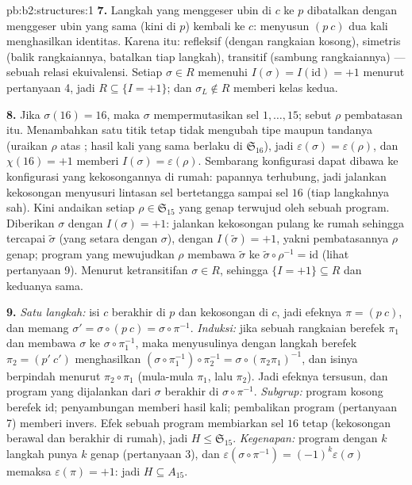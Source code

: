 \begin{solution}{pb:b2:structures:1}
\textbf{7.} Langkah yang menggeser ubin di $c$ ke $p$ dibatalkan
dengan menggeser ubin yang sama (kini di $p$) kembali ke $c$: menyusun
$(p\ c)$ dua kali menghasilkan identitas. Karena itu: refleksif (dengan
rangkaian kosong), simetris (balik rangkaiannya, batalkan tiap langkah),
transitif (sambung rangkaiannya) --- sebuah relasi ekuivalensi. Setiap
$\sigma \in R$ memenuhi $I(\sigma) = I(\mathrm{id}) = +1$ menurut
pertanyaan 4, jadi $R \subseteq \{I = +1\}$; dan $\sigma_L \notin R$
memberi kelas kedua.

\textbf{8.} Jika $\sigma(16) = 16$, maka $\sigma$ mempermutasikan
sel $1, \dots, 15$; sebut $\rho$ pembatasan itu. Menambahkan satu
titik tetap tidak mengubah tipe  maupun tandanya
(uraikan $\rho$ atas ; hasil kali yang sama berlaku di
$\mathfrak{S}_{16}$), jadi $\varepsilon(\sigma) =
\varepsilon(\rho)$, dan $\chi(16) = +1$ memberi $I(\sigma) =
\varepsilon(\rho)$. Sembarang konfigurasi dapat dibawa ke konfigurasi
yang kekosongannya di rumah: papannya terhubung, jadi jalankan
kekosongan menyusuri lintasan sel bertetangga sampai sel $16$ (tiap
langkahnya sah). Kini andaikan setiap $\rho \in \mathfrak{S}_{15}$ yang
genap terwujud oleh sebuah program. Diberikan $\sigma$ dengan $I(\sigma)
= +1$: jalankan kekosongan pulang ke rumah sehingga tercapai
$\widetilde\sigma$ (yang setara dengan $\sigma$), dengan
$I(\widetilde\sigma) = +1$, yakni pembatasannya $\rho$ genap; program
yang mewujudkan $\rho$ membawa $\widetilde\sigma$ ke
$\widetilde\sigma \circ \rho^{-1} = \mathrm{id}$ (lihat pertanyaan
9). Menurut ketransitifan $\sigma \in R$, sehingga $\{I = +1\} \subseteq
R$ dan keduanya sama.

\textbf{9.} \emph{Satu langkah:} isi $c$ berakhir di $p$
dan kekosongan di $c$, jadi efeknya $\pi = (p\ c)$, dan memang
$\sigma' = \sigma \circ (p\ c) = \sigma \circ \pi^{-1}$.
\emph{Induksi:} jika sebuah rangkaian berefek $\pi_1$ dan membawa
$\sigma$ ke $\sigma \circ \pi_1^{-1}$, maka menyusulinya dengan langkah
berefek $\pi_2 = (p'\ c')$ menghasilkan $(\sigma \circ \pi_1^{-1})
\circ \pi_2^{-1} = \sigma \circ (\pi_2\pi_1)^{-1}$, dan isinya berpindah
menurut $\pi_2 \circ \pi_1$ (mula-mula $\pi_1$, lalu $\pi_2$). Jadi
efeknya tersusun, dan program yang dijalankan dari $\sigma$ berakhir di
$\sigma \circ \pi^{-1}$. \emph{Subgrup:} program kosong berefek
$\mathrm{id}$; penyambungan memberi hasil kali; pembalikan program
(pertanyaan 7) memberi invers. Efek sebuah program membiarkan sel $16$
tetap (kekosongan berawal dan berakhir di rumah), jadi $H \leq
\mathfrak{S}_{15}$. \emph{Kegenapan:} program dengan $k$ langkah punya
$k$ genap (pertanyaan 3), dan $\varepsilon(\sigma \circ \pi^{-1}) =
(-1)^k\varepsilon(\sigma)$ memaksa $\varepsilon(\pi) = +1$: jadi $H
\subseteq A_{15}$.


\end{solution}
